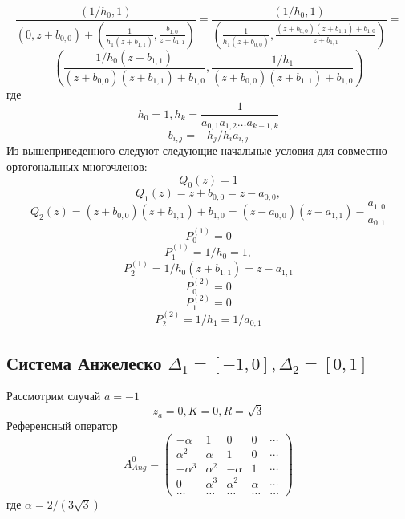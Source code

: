 \documentclass{report}
\begin{document}
$$
\displaystyle\frac{(1/h_0,1)}{(0,z+b_{0,0}) +  \left(\displaystyle\frac{1}{h_1(z+b_{1,1})},\frac{b_{1,0}}{z+b_{1,1}}\right)}=
\displaystyle\frac{(1/h_0,1)}
{\left(\displaystyle\frac{1}{h_1(z+b_{0,0})} , \displaystyle\frac{(z+b_{0,0})(z+b_{1,1})+b_{1,0}}{z+b_{1,1}}\right) }=
$$
$$ 
\left( \displaystyle\frac{1/h_0(z+b_{1,1})}{(z+b_{0,0})(z+b_{1,1})+b_{1,0}}, 
\displaystyle\frac{1/h_1}{(z+b_{0,0})(z+b_{1,1})+b_{1,0}} \right) 
$$
где
$$
h_0=1, 
h_k=\displaystyle\frac{1}{a_{0,1}a_{1,2}\ldots a_{k-1,k}}
$$
$$
b_{i,j}=-h_j/h_i a_{i,j}
$$
Из вышеприведенного следуют следующие начальные условия для совместно ортогональных многочленов:
$$
Q_0(z)=1
$$
$$
Q_1(z)=z+b_{0,0}=z-a_{0,0}, 
$$
$$
Q_2(z)=(z+b_{0,0})(z+b_{1,1})+b_{1,0}=(z-a_{0,0})(z-a_{1,1})-\frac{a_{1,0}}{a_{0,1}}
$$
$$
P_0^{(1)}=0
$$
$$
P_1^{(1)}=1/h_0=1, 
$$
$$
P_2^{(1)}=1/h_0(z+b_{1,1})=z-a_{1,1}
$$
$$
P_0^{(2)}=0
$$
$$
P_1^{(2)}=0
$$
$$
P_2^{(2)}=1/h_1=1/a_{0,1}
$$


\subsection {Система Анжелеско $\Delta_1=[-1,0], \Delta_2 =[0,1]$}
Рассмотрим случай $a=-1$ \\
$$
z_a=0, K=0, R = \sqrt{3}
$$
Референсный оператор
$$
A^0_{Ang}=
\left(\begin{array}{cccccccccccc}
-\alpha & 1 & 0 & 0 &  \cdots \\
\alpha^2 & \alpha & 1 & 0 &  \cdots \\
-\alpha^3 & \alpha^2 & -\alpha & 1 &  \cdots \\
0 & \alpha^3 & \alpha^2 & \alpha &  \cdots \\
\ldots & \ldots & \ldots & \ldots & \ldots
\end{array}\right)
$$
где $\alpha=2/(3\sqrt{3})$
\end{document}
